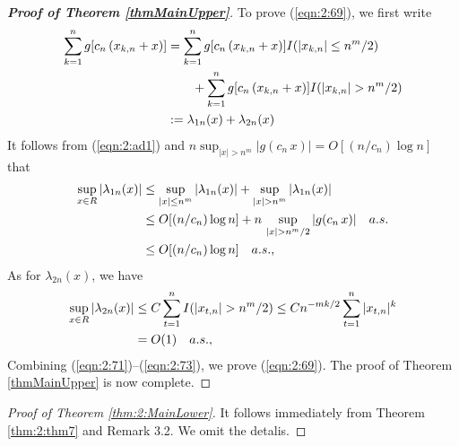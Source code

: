 \begin{proof}[\bf Proof of Theorem \ref {thmMainUpper}]
To prove (\ref {eqn:2:69}), we first write
\begin{align}
\sum_{k=1}^{n}g[c_{n}\,(x_{k,n}+x)] &= \sum_{k=1}^{n}g[c_{n}\,(x_{k,n}+x)] I(|x_{k,n}| \le n^{m}/2)  \no\\
&\qquad + \sum_{k=1}^{n}g[c_{n}\,(x_{k,n}+x)] I(|x_{k,n}| > n^{m}/2) \no\\
&:= \lambda_{1n}(x) + \lambda_{2n}(x) \la {eqn:2:71}
\end{align}
It follows from (\ref {eqn:2:ad1}) and $n \sup_{|x| > n^{m}}|g(c_n \, x)| = O[(n/c_n) \log n]$ that
\begin{align}
\sup_{x\in R} |\lambda_{1n}(x) |&\le \sup_{|x| \le n^{m}} |\lambda_{1n}(x)| + \sup_{|x| > n^{m}} | \lambda_{1n}(x) | \no\\
&\le O[(n/c_n)\log n] + n \, \sup_{|x| > n^{m}/2} | g(c_n \, x)| \quad a.s.  \no\\
&\le O[(n/c_n)\log n] \quad a.s., \la {eqn:2:72}
\end{align}
As for $\lambda_{2n}(x)$, we have
\begin{align}
\sup_{x\in R} |\lambda_{2n}(x)| &\le C \sum_{t = 1}^n  I(| x_{t,n}| > n^{m}/2)  \le C n^{-m k/2} \sum_{t = 1}^n  |x_{t,n}|^{k} \no\\
& = O(1) \quad a.s., \la {eqn:2:73}
\end{align}
Combining (\ref {eqn:2:71})--(\ref {eqn:2:73}), we prove (\ref {eqn:2:69}).
The proof of Theorem \ref {thmMainUpper} is now complete.
\end{proof}

\begin{proof}[Proof of Theorem \ref {thm:2:MainLower}] It follows immediately from Theorem \ref {thm:2:thm7} and Remark 3.2. We omit the detalis.\end{proof}

